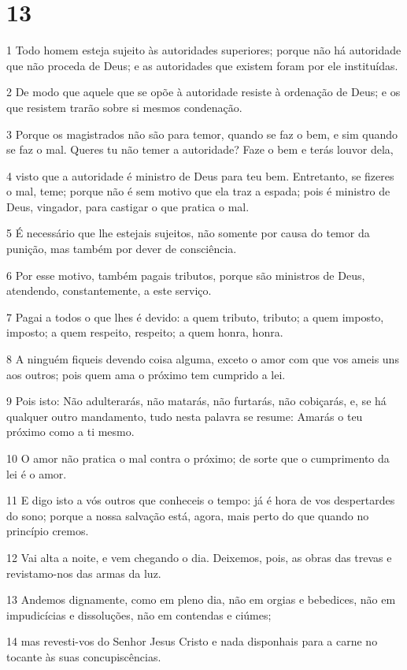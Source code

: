 \chapter{13}

\par 1 Todo homem esteja sujeito às autoridades superiores; porque não há autoridade que não proceda de Deus; e as autoridades que existem foram por ele instituídas.
\par 2 De modo que aquele que se opõe à autoridade resiste à ordenação de Deus; e os que resistem trarão sobre si mesmos condenação.
\par 3 Porque os magistrados não são para temor, quando se faz o bem, e sim quando se faz o mal. Queres tu não temer a autoridade? Faze o bem e terás louvor dela,
\par 4 visto que a autoridade é ministro de Deus para teu bem. Entretanto, se fizeres o mal, teme; porque não é sem motivo que ela traz a espada; pois é ministro de Deus, vingador, para castigar o que pratica o mal.
\par 5 É necessário que lhe estejais sujeitos, não somente por causa do temor da punição, mas também por dever de consciência.
\par 6 Por esse motivo, também pagais tributos, porque são ministros de Deus, atendendo, constantemente, a este serviço.
\par 7 Pagai a todos o que lhes é devido: a quem tributo, tributo; a quem imposto, imposto; a quem respeito, respeito; a quem honra, honra.
\par 8 A ninguém fiqueis devendo coisa alguma, exceto o amor com que vos ameis uns aos outros; pois quem ama o próximo tem cumprido a lei.
\par 9 Pois isto: Não adulterarás, não matarás, não furtarás, não cobiçarás, e, se há qualquer outro mandamento, tudo nesta palavra se resume: Amarás o teu próximo como a ti mesmo.
\par 10 O amor não pratica o mal contra o próximo; de sorte que o cumprimento da lei é o amor.
\par 11 E digo isto a vós outros que conheceis o tempo: já é hora de vos despertardes do sono; porque a nossa salvação está, agora, mais perto do que quando no princípio cremos.
\par 12 Vai alta a noite, e vem chegando o dia. Deixemos, pois, as obras das trevas e revistamo-nos das armas da luz.
\par 13 Andemos dignamente, como em pleno dia, não em orgias e bebedices, não em impudicícias e dissoluções, não em contendas e ciúmes;
\par 14 mas revesti-vos do Senhor Jesus Cristo e nada disponhais para a carne no tocante às suas concupiscências.

